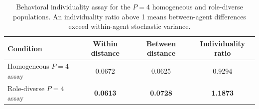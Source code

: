 \begin{table}[t]
\centering
\caption{Behavioral individuality assay for the $P{=}4$ homogeneous and role-diverse populations. An individuality ratio above 1 means between-agent differences exceed within-agent stochastic variance.}
\label{tab:individuality}
\begin{tabular}{@{}lccc@{}}
\toprule
Condition & Within distance & Between distance & Individuality ratio \\
\midrule
Homogeneous $P{=}4$ assay & 0.0672 & 0.0625 & 0.9294 \\
Role-diverse $P{=}4$ assay & \textbf{0.0613} & \textbf{0.0728} & \textbf{1.1873} \\
\bottomrule
\end{tabular}
\end{table}
